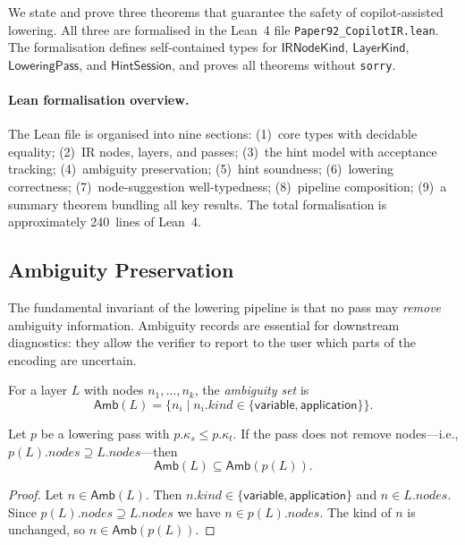 \documentclass[11pt]{article}
\newcommand{\Amb}{\mathsf{Amb}}
\begin{document}
We state and prove three theorems that guarantee the safety of
copilot-assisted lowering.  All three are formalised in the Lean~4
file \texttt{Paper92\_CopilotIR.lean}.  The formalisation defines
self-contained types for $\mathsf{IRNodeKind}$, $\mathsf{LayerKind}$,
$\mathsf{LoweringPass}$, and $\mathsf{HintSession}$, and proves all
theorems without \texttt{sorry}.

\paragraph{Lean formalisation overview.}
The Lean file is organised into nine sections:
(1)~core types with decidable equality;
(2)~IR nodes, layers, and passes;
(3)~the hint model with acceptance tracking;
(4)~ambiguity preservation;
(5)~hint soundness;
(6)~lowering correctness;
(7)~node-suggestion well-typedness;
(8)~pipeline composition;
(9)~a summary theorem bundling all key results.
The total formalisation is approximately 240~lines of Lean~4.

\subsection{Ambiguity Preservation}\label{sec:amb-pres}

The fundamental invariant of the lowering pipeline is that no pass may
\emph{remove} ambiguity information.  Ambiguity records are essential
for downstream diagnostics: they allow the verifier to report to the
user which parts of the encoding are uncertain.

\begin{definition}\label{def:amb}
For a layer $L$ with nodes $n_1, \dots, n_k$, the \emph{ambiguity set}
is
\[
  \Amb(L) = \{ n_i \mid n_i.\mathit{kind} \in
    \{\mathsf{variable}, \mathsf{application}\} \}.
\]
\end{definition}

\begin{theorem}\label{thm:amb-pres}
Let $p$ be a lowering pass with $p.\kappa_s \le p.\kappa_t$.  If the
pass does not remove nodes---i.e., $p(L).\mathit{nodes} \supseteq
L.\mathit{nodes}$---then
\[
  \Amb(L) \subseteq \Amb(p(L)).
\]
\end{theorem}

\begin{proof}
Let $n \in \Amb(L)$.  Then $n.\mathit{kind} \in \{\mathsf{variable},
\mathsf{application}\}$ and $n \in L.\mathit{nodes}$.  Since
$p(L).\mathit{nodes} \supseteq L.\mathit{nodes}$ we have
$n \in p(L).\mathit{nodes}$.  The kind of $n$ is unchanged, so
$n \in \Amb(p(L))$.
\end{proof}
\end{document}
